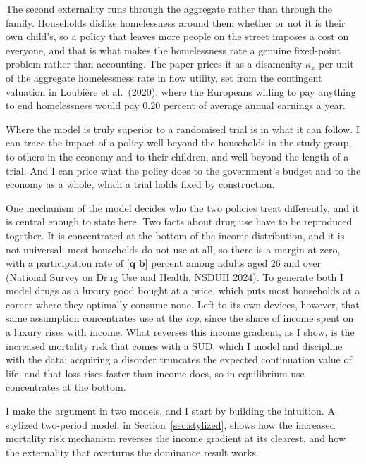 \documentclass[10pt]{article}
\begin{document}
The second externality runs through the aggregate rather than through the family.
Households dislike homelessness around them whether or not it is their own child's, so
a policy that leaves more people on the street imposes a cost on everyone, and that is
what makes the homelessness rate a genuine fixed-point problem rather than
accounting. The paper prices it as a disamenity $\kappa_x$ per
unit of the aggregate homelessness rate in flow utility, set from the contingent
valuation in Loubi\`ere et al.\ (2020), where the Europeans willing to pay anything to
end homelessness would pay $0.20$ percent of average annual earnings a year.

Where the model is truly superior to a randomised trial is in what it can follow. I
can trace the impact of a policy well beyond the households in the study group, to
others in the economy and to their children, and well beyond the length of a trial.
And I can price what the policy does to the government's budget and to the economy as
a whole, which a trial holds fixed by construction.



One mechanism of the model decides who the two policies treat differently, and it is
central enough to state here. Two facts about drug use have to be reproduced
together. It is concentrated at the bottom of the income distribution, and it is not
universal: most households do not use at all, so there is a margin at zero, with a
participation rate of $\textbf{[q_b]}$ percent among adults aged $26$ and over (National Survey on Drug Use and Health, NSDUH 2024). To
generate both I model drugs as a luxury good bought at a price, which puts most
households at a corner where they optimally consume none. Left to its own devices,
however, that same assumption concentrates use at the \emph{top}, since the share of
income spent on a luxury rises with income. What reverses this income
gradient, as I show, is the increased mortality risk that comes with a SUD, which I
model and discipline with the data: acquiring a disorder truncates the expected
continuation value of life, and that loss rises faster than income does, so in
equilibrium use concentrates at the bottom.


I make the argument in two models, and I start by building
the intuition. A stylized
two-period model, in Section~\ref{sec:stylized}, shows how the increased mortality risk
mechanism reverses the income gradient at its clearest, and how the externality that
overturns the dominance result works.
\end{document}
